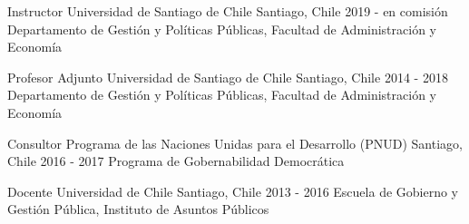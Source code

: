 





\begin{cventries}
\cventry
{Instructor} 
{Universidad de Santiago de Chile} 
{Santiago, Chile} 
{2019 - en comisión}
{Departamento de Gestión y Políticas Públicas, Facultad de Administración y Economía}\vspace{1.5mm}

\cventry
{Profesor Adjunto} 
{Universidad de Santiago de Chile} 
{Santiago, Chile} 
{2014 - 2018}
{Departamento de Gestión y Políticas Públicas, Facultad de Administración y Economía}\vspace{1.5mm}

\cventry
{Consultor} 
{Programa de las Naciones Unidas para el Desarrollo (PNUD)} 
{Santiago, Chile} 
{2016 - 2017}
{Programa de Gobernabilidad Democrática} \vspace{1.5mm}

\cventry
{Docente} 
{Universidad de Chile} 
{Santiago, Chile} 
{2013 - 2016}
{Escuela de Gobierno y Gestión Pública, Instituto de Asuntos Públicos}\vspace{1.5mm}

\end{cventries}
